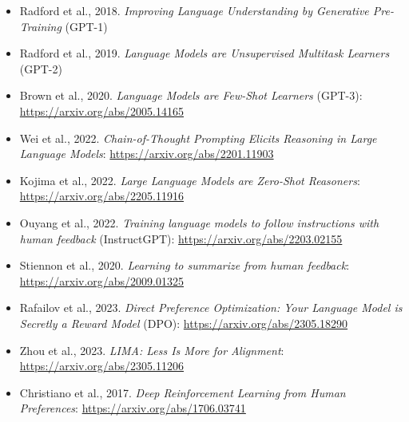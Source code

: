 \begin{itemize}
    \item Radford et al., 2018. \textit{Improving Language Understanding by Generative Pre-Training} (GPT-1)
    \item Radford et al., 2019. \textit{Language Models are Unsupervised Multitask Learners} (GPT-2)
    \item Brown et al., 2020. \textit{Language Models are Few-Shot Learners} (GPT-3): \url{https://arxiv.org/abs/2005.14165}
    \item Wei et al., 2022. \textit{Chain-of-Thought Prompting Elicits Reasoning in Large Language Models}: \url{https://arxiv.org/abs/2201.11903}
    \item Kojima et al., 2022. \textit{Large Language Models are Zero-Shot Reasoners}: \url{https://arxiv.org/abs/2205.11916}
    \item Ouyang et al., 2022. \textit{Training language models to follow instructions with human feedback} (InstructGPT): \url{https://arxiv.org/abs/2203.02155}
    \item Stiennon et al., 2020. \textit{Learning to summarize from human feedback}: \url{https://arxiv.org/abs/2009.01325}
    \item Rafailov et al., 2023. \textit{Direct Preference Optimization: Your Language Model is Secretly a Reward Model} (DPO): \url{https://arxiv.org/abs/2305.18290}
    \item Zhou et al., 2023. \textit{LIMA: Less Is More for Alignment}: \url{https://arxiv.org/abs/2305.11206}
    \item Christiano et al., 2017. \textit{Deep Reinforcement Learning from Human Preferences}: \url{https://arxiv.org/abs/1706.03741}
\end{itemize}


